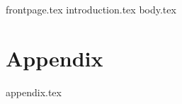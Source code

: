 \documentclass[runningheads]{llncs}
\begin{document}
{frontpage.tex}
{introduction.tex}
{body.tex}




\appendix
\section*{Appendix}
{appendix.tex}
\end{document}
